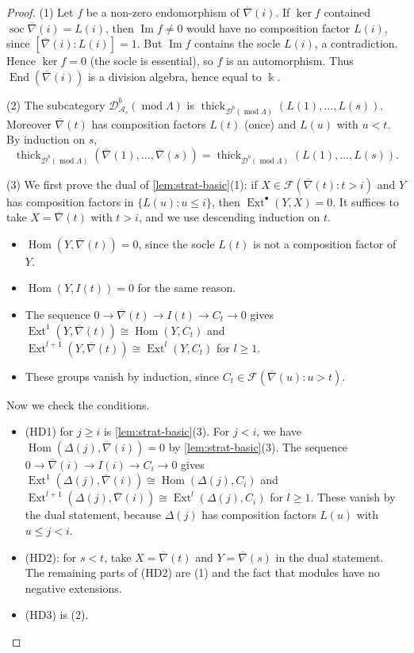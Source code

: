 \documentclass[11pt,reqno]{amsart}
\theoremstyle{plain}
\theoremstyle{definition}
\theoremstyle{remark}
\newcommand{\kk}{\Bbbk}
\DeclareMathOperator{\Hom}{Hom}
\DeclareMathOperator{\End}{End}
\DeclareMathOperator{\Ext}{Ext}
\DeclareMathOperator{\soc}{soc}
\DeclareMathOperator{\im}{Im}
\newcommand{\modd}{\operatorname{mod}}
\newcommand{\Db}{\mathcal{D}^b}
\newcommand{\thick}[2][\cD]{\operatorname{thick}_{#1}(#2)}
\newcommand{\nablabar}{\overline{\nabla}}
\newcommand{\cD}{\mathcal{D}}
\newcommand{\cA}{\mathcal{A}}
\newcommand{\cF}{\mathcal{F}}
\begin{document}
\begin{proof}
(1) Let $f$ be a non-zero endomorphism of $\nablabar(i)$. If $\ker f$ contained $\soc\nablabar(i)=L(i)$, then $\im f\ne0$ would have no composition factor $L(i)$, since $[\nablabar(i):L(i)]=1$. But $\im f$ contains the socle $L(i)$, a contradiction. Hence $\ker f=0$ (the socle is essential), so $f$ is an automorphism. Thus $\End(\nablabar(i))$ is a division algebra, hence equal to $\kk$.

(2) The subcategory $\Db_{\cA_s}(\modd\Lambda)$ is $\thick[\Db(\modd\Lambda)]{L(1),\dots,L(s)}$. Moreover $\nablabar(t)$ has composition factors $L(t)$ (once) and $L(u)$ with $u<t$. By induction on $s$,
\[\thick[\Db(\modd\Lambda)]{\nablabar(1),\dots,\nablabar(s)}=\thick[\Db(\modd\Lambda)]{L(1),\dots,L(s)}.\]

(3) We first prove the dual of \cref{lem:strat-basic}(1): if $X\in\cF(\nablabar(t):t>i)$ and $Y$ has composition factors in $\{L(u):u\le i\}$, then $\Ext^\bullet(Y,X)=0$. It suffices to take $X=\nablabar(t)$ with $t>i$, and we use descending induction on $t$.
\begin{itemize}
\item $\Hom(Y,\nablabar(t))=0$, since the socle $L(t)$ is not a composition factor of $Y$.
\item $\Hom(Y,I(t))=0$ for the same reason.
\item The sequence $0\to\nablabar(t)\to I(t)\to C_t\to0$ gives $\Ext^1(Y,\nablabar(t))\cong\Hom(Y,C_t)$ and $\Ext^{l+1}(Y,\nablabar(t))\cong\Ext^l(Y,C_t)$ for $l\ge1$.
\item These groups vanish by induction, since $C_t\in\cF(\nablabar(u):u>t)$.
\end{itemize}
Now we check the conditions.
\begin{itemize}
\item (HD1) for $j\ge i$ is \cref{lem:strat-basic}(3). For $j<i$, we have $\Hom(\Delta(j),\nablabar(i))=0$ by \cref{lem:strat-basic}(3). The sequence $0\to\nablabar(i)\to I(i)\to C_i\to0$ gives $\Ext^1(\Delta(j),\nablabar(i))\cong\Hom(\Delta(j),C_i)$ and $\Ext^{l+1}(\Delta(j),\nablabar(i))\cong\Ext^l(\Delta(j),C_i)$ for $l\ge1$. These vanish by the dual statement, because $\Delta(j)$ has composition factors $L(u)$ with $u\le j<i$.
\item (HD2): for $s<t$, take $X=\nablabar(t)$ and $Y=\nablabar(s)$ in the dual statement. The remaining parts of (HD2) are (1) and the fact that modules have no negative extensions.
\item (HD3) is (2). \qedhere
\end{itemize}
\end{proof}
\end{document}
